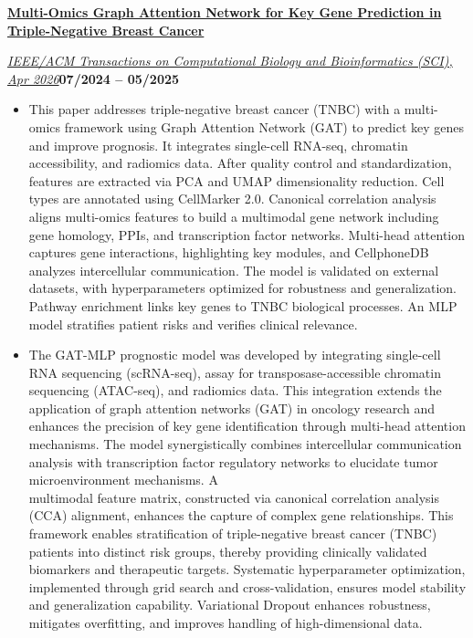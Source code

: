 \documentclass[10pt,a4paper]{article}
\newcommand{\titleline}[1]{\par\vspace{0.80bp}\noindent\textbf{#1}\par\vspace{0.50bp}}
\newcommand{\metaline}[2]{%
  \par\noindent\uline{\textit{#1}}\hfill\textbf{#2}\par\vspace{0.50bp}%
}
\let\venueline\metaline
\newenvironment{cvitems}{%
  \begin{itemize}[leftmargin=14.20bp,labelwidth=4.20bp,labelsep=10.00bp,align=left,
    topsep=0bp,itemsep=0bp,parsep=0bp,partopsep=0bp,label={\textbullet}]
}{\end{itemize}}
\begin{document}
\titleline{\href{https://ieeexplore.ieee.org/document/11478305}{Multi-Omics Graph Attention Network for Key Gene Prediction in Triple-Negative Breast Cancer}}
\venueline{IEEE/ACM Transactions on Computational Biology and Bioinformatics (SCI), Apr 2026}{07/2024 -- 05/2025}
\begin{cvitems}
\item This paper addresses triple-negative breast cancer (TNBC) with a multi-omics framework using Graph Attention Network (GAT) to predict key genes and improve prognosis. It integrates single-cell RNA-seq, chromatin accessibility, and radiomics data. After quality control and standardization, features are extracted via PCA and UMAP dimensionality reduction. Cell types are annotated using CellMarker 2.0. Canonical correlation analysis aligns multi-omics features to build a multimodal gene network including gene homology, PPIs, and transcription factor networks. Multi-head attention captures gene interactions, highlighting key modules, and CellphoneDB analyzes intercellular communication. The model is validated on external datasets, with hyperparameters optimized for robustness and generalization. Pathway enrichment links key genes to TNBC biological processes. An MLP model stratifies patient risks and verifies clinical relevance.
\item The GAT-MLP prognostic model was developed by integrating single-cell RNA sequencing (scRNA-seq), assay for transposase-accessible chromatin sequencing (ATAC-seq), and radiomics data. This integration extends the application of graph attention networks (GAT) in oncology research and enhances the precision of key gene identification through multi-head attention mechanisms. The model synergistically combines intercellular communication analysis with transcription factor regulatory networks to elucidate tumor microenvironment mechanisms. A\\
multimodal feature matrix, constructed via canonical correlation analysis (CCA) alignment, enhances the capture of complex gene relationships. This framework enables stratification of triple-negative breast cancer (TNBC) patients into distinct risk groups, thereby providing clinically validated biomarkers and therapeutic targets. Systematic hyperparameter optimization, implemented through grid search and cross-validation, ensures model stability and generalization capability. Variational Dropout enhances robustness, mitigates overfitting, and improves handling of high-dimensional data.
\end{cvitems}
\end{document}
